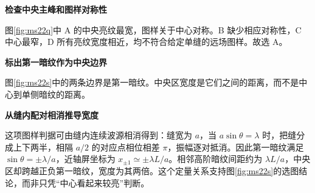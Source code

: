 \begin{solution}\textbf{检查中央主峰和图样对称性}\par\nobreak
图\ref{fig:ms22q}中 A 的中央亮纹最宽，图样关于中心对称。B 缺少相应对称性，C 中心最窄，D 所有亮纹宽度相近，均不符合给定单缝的远场图样。故选 \(\boxed{\mathrm A}\)。




\par\medskip{}\noindent\textbf{标出第一暗纹作为中央边界}\par\nobreak
图\ref{fig:ms22s}中的两条边界是第一暗纹。中央区宽度是它们之间的距离，而不是中心到单侧暗纹的距离。



\par\medskip{}\noindent\textbf{从缝内配对相消推导宽度}\par\nobreak
这项图样判据可由缝内连续波源相消得到：缝宽为 \(a\)，当 \(a\sin\theta=\lambda\) 时，把缝分成上下两半，相隔 \(a/2\) 的对应点相位相差 \(\pi\)，振幅逐对抵消。因此第一暗纹满足 \(\sin\theta=\pm\lambda/a\)，近轴屏坐标为 \(x_{\pm1}\simeq\pm\lambda L/a\)。相邻高阶暗纹间距约为 \(\lambda L/a\)，中央区却跨越正负第一暗纹，宽度为其两倍。这个定量关系支持图\ref{fig:ms22s}的选图结论，而非只凭“中心看起来较亮”判断。
\end{solution}

